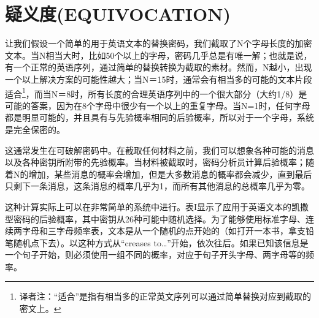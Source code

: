 \documentclass[]{article}
\begin{document}
\section{疑义度(EQUIVOCATION)}

让我们假设一个简单的用于英语文本的替换密码，我们截取了N个字母长度的加密文本。当N相当大时，比如50个以上的字母，密码几乎总是有唯一解；也就是说，有一个正常的英语序列，通过简单的替换转换为截取的素材。然而，N越小，出现一个以上解决方案的可能性越大；当N＝15时，通常会有相当多的可能的文本片段适合\footnote{译者注：“适合”是指有相当多的正常英文序列可以通过简单替换对应到截取的密文上。}，而当N＝8时，所有长度的合理英语序列中的一个很大部分（大约1/8）是可能的答案，因为在8个字母中很少有一个以上的重复字母。当N=1时，任何字母都是明显可能的，并且具有与先验概率相同的后验概率，所以对于一个字母，系统是完全保密的。

这通常发生在可破解密码中。在截取任何材料之前，我们可以想象各种可能的消息以及各种密钥所附带的先验概率。当材料被截取时，密码分析员计算后验概率；随着N的增加，某些消息的概率会增加，但是大多数消息的概率都会减少，直到最后只剩下一条消息，这条消息的概率几乎为1，而所有其他消息的总概率几乎为零。

这种计算实际上可以在非常简单的系统中进行。表I显示了应用于英语文本的凯撒型密码的后验概率，其中密钥从26种可能中随机选择。为了能够使用标准字母、连续两字母和三字母频率表，文本是从一个随机的点开始的（如打开一本书，拿支铅笔随机点下去）。以这种方式从“creases to…”开始，依次往后。如果已知该信息是一个句子开始，则必须使用一组不同的概率，对应于句子开头字母、两字母等的频率。
\end{document}
